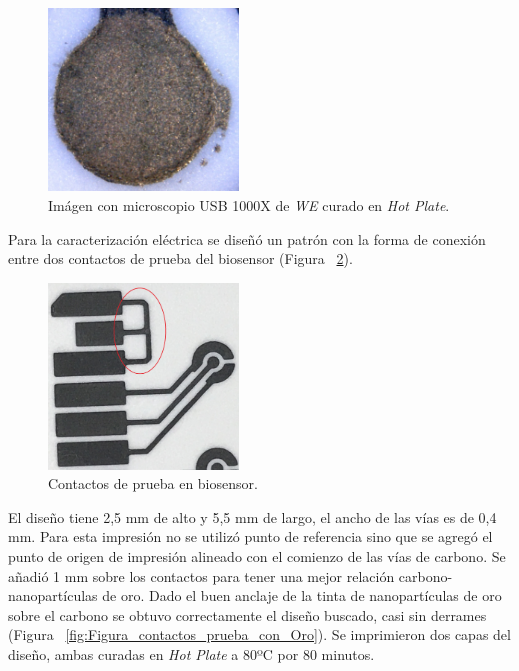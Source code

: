 \begin{figure}[H]
  \centering
    \includegraphics[width=0.45\textwidth]{Figuras/Figura_impresion_curado}
  \caption{Imágen con microscopio USB 1000X de \emph{WE} curado en \textit{Hot Plate}.}
  \label{fig:Figura_impresion_curado}
\end{figure}

Para la caracterización eléctrica se diseñó un patrón con la forma de conexión entre dos contactos de prueba del biosensor (Figura ~\ref{fig:Figura_contactos_prueba}).

\begin{figure}[H]
  \centering
    \includegraphics[width=0.45\textwidth]{Figuras/Figura_contactos_prueba}
  \caption{Contactos de prueba en biosensor.}
  \label{fig:Figura_contactos_prueba}
\end{figure}

El diseño tiene 2,5 mm de alto y 5,5 mm de largo, el ancho de las vías es de 0,4 mm. Para esta impresión no se utilizó punto de referencia sino que se agregó el punto de origen de impresión alineado con el comienzo de las vías de carbono. Se añadió 1 mm sobre los contactos para tener una mejor relación carbono-nanopartículas de oro. Dado el buen anclaje de la tinta de nanopartículas de oro sobre el carbono se obtuvo correctamente el diseño buscado, casi sin derrames (Figura ~\ref{fig:Figura_contactos_prueba_con_Oro}). Se imprimieron dos capas del diseño, ambas curadas en \textit{Hot Plate} a 80ºC por 80 minutos.


